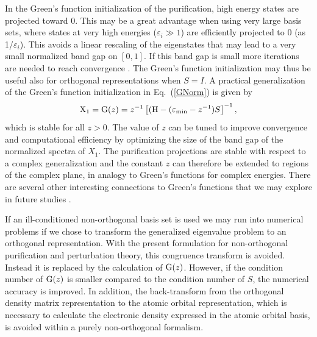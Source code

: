 \documentclass[twocolumn,showpacs,preprintnumbers,amsmath,amssymb]{revtex4}
\begin{document}
In the Green's function initialization of the purification, high energy states are projected 
toward $0$.  This may be a great advantage when using very large basis sets, where states at very high energies
($\varepsilon_i \gg 1$) are efficiently projected to $0$ (as 1/$\varepsilon_i$). This avoids a linear rescaling of 
the eigenstates that may lead to
a very small normalized band gap on $[0,1]$. If this band gap is small more
iterations are needed to reach convergence \cite{NiklassonTC2,NiklassonTRS4}.
The Green's function initialization may thus be
useful also for orthogonal representations when $S=I$. 
A practical generalization of the
Green's function initialization in Eq.\ (\ref{GNorm}) is given by
\begin{equation}
{\rm X}_1 = {\rm G}(z) = z^{-1}\left[({\rm H} - (\varepsilon_{\rm min} - z^{-1})S\right]^{-1},
\end{equation}
which is stable for all $z > 0$. The value of $z$ can be tuned to improve convergence and computational
efficiency by optimizing the size of the band gap of the normalized spectra of $X_1$. 
The purification projections are stable with respect to a complex generalization and the
constant $z$ can therefore be extended to regions of the complex plane, in analogy to 
Green's functions for complex energies. There are several other interesting connections to Green's functions
that we may explore in future studies \cite{Niklasson_Unpubl}.


If an ill-conditioned non-orthogonal basis set is used we may run into numerical problems if we chose to
transform the generalized eigenvalue problem to an orthogonal representation. 
With the present formulation for non-orthogonal purification and perturbation theory, this congruence transform 
is avoided. Instead it is replaced by the calculation of ${\rm G}(z)$.  However, if the condition number of 
${\rm G}(z)$ is smaller compared to the condition number of $S$, the numerical accuracy is improved.
In addition, the back-transform from the orthogonal density matrix representation to the atomic orbital 
representation, which is necessary to calculate the electronic density expressed in the atomic
orbital basis, is avoided within a purely non-orthogonal formalism.
\end{document}
